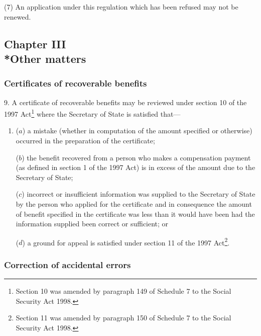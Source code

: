 \documentclass[12pt,a4paper]{article}
\begin{document}
(7) An application under this regulation which has been refused may not be renewed.


\subsection[Chapter III --- Other matters]{Chapter III\\*Other matters}

\subsubsection[9. Certificates of recoverable benefits]{Certificates of recoverable benefits}

\renewcommand\parthead{--- Part II Chapter III}

9.  A certificate of recoverable benefits may be reviewed under section 10 of the 1997 Act\footnote{\frenchspacing Section 10 was amended by paragraph 149 of Schedule 7 to the Social Security Act 1998.} where the Secretary of State is satisfied that—
\begin{enumerate}\item[]
($a$) a mistake (whether in computation of the amount specified or otherwise) occurred in the preparation of the certificate;

($b$) the benefit recovered from a person who makes a compensation payment (as defined in section 1 of the 1997 Act) is in excess of the amount due to the Secretary of State;

($c$) incorrect or insufficient information was supplied to the Secretary of State by the person who applied for the certificate and in consequence the amount of benefit specified in the certificate was less than it would have been had the information supplied been correct or sufficient; or

($d$) a ground for appeal is satisfied under section 11 of the 1997 Act\footnote{\frenchspacing Section 11 was amended by paragraph 150 of Schedule 7 to the Social Security Act 1998.}.
\end{enumerate}

\subsubsection[9A. Correction of accidental errors]{Correction of accidental errors}
\end{document}
